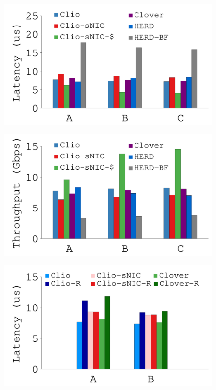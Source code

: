 {
\begin{figure}[th]
\begin{minipage}{\figWidthSix}
\begin{center}
\centerline{\includegraphics[width=\columnwidth]{Figures/g_plot_ycsb.pdf}}
\vspace{-0.1in}
{
}
\end{center}
\end{minipage}
\begin{minipage}{\figWidthSix}
\begin{center}
\centerline{\includegraphics[width=\columnwidth]{Figures/g_plot_ycsb_throughput.pdf}}
\vspace{-0.1in}
{
}
\end{center}
\end{minipage}
\begin{minipage}{\figWidthSix}
\begin{center}
\centerline{\includegraphics[width=\columnwidth]{Figures/g_plot_ycsb_replication.pdf}}

\end{center}
\end{minipage}
\end{figure}}
